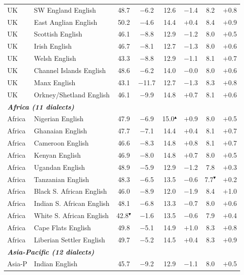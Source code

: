 \begin{table}[t]
\begin{tabular}{ll cc cc cc}
UK & SW England English & 48.7 & $-$6.2 & 12.6 & $-$1.4 & 8.2 & $+$0.8 \\
UK & East Anglian English & 50.2 & $-$4.6 & 14.4 & $+$0.4 & 8.4 & $+$0.9 \\
UK & Scottish English & 46.1 & $-$8.8 & 12.9 & $-$1.2 & 8.0 & $+$0.5 \\
UK & Irish English & 46.7 & $-$8.1 & 12.7 & $-$1.3 & 8.0 & $+$0.6 \\
UK & Welsh English & 43.3 & $-$8.8 & 12.9 & $-$1.1 & 8.1 & $+$0.7 \\
UK & Channel Islands English & 48.6 & $-$6.2 & 14.0 & $-$0.0 & 8.0 & $+$0.6 \\
UK & Manx English & 43.1 & $-$11.7 & 12.7 & $-$1.3 & 8.3 & $+$0.8 \\
UK & Orkney/Shetland English & 46.1 & $-$9.9 & 14.8 & $+$0.7 & 8.1 & $+$0.6 \\
\midrule
\multicolumn{8}{l}{\textit{\textbf{Africa (11 dialects)}}} \\
Africa & Nigerian English & 47.9 & $-$6.9 & 15.0$^\blacktriangle$ & $+$0.9 & 8.0 & $+$0.5 \\
Africa & Ghanaian English & 47.7 & $-$7.1 & 14.4 & $+$0.4 & 8.1 & $+$0.7 \\
Africa & Cameroon English & 46.6 & $-$8.3 & 14.8 & $+$0.8 & 8.1 & $+$0.7 \\
Africa & Kenyan English & 46.9 & $-$8.0 & 14.8 & $+$0.7 & 8.0 & $+$0.5 \\
Africa & Ugandan English & 48.9 & $-$5.9 & 12.9 & $-$1.2 & 7.8 & $+$0.3 \\
Africa & Tanzanian English & 48.3 & $-$6.5 & 13.5 & $-$0.6 & 7.7$^\blacktriangledown$ & $+$0.2 \\
Africa & Black S. African English & 46.0 & $-$8.9 & 12.0 & $-$1.9 & 8.4 & $+$1.0 \\
Africa & Indian S. African English & 48.1 & $-$6.8 & 13.3 & $-$0.7 & 8.0 & $+$0.6 \\
Africa & White S. African English & 42.8$^\blacktriangledown$ & $-$1.6 & 13.5 & $-$0.6 & 7.9 & $+$0.4 \\
Africa & Cape Flats English & 49.8 & $-$5.1 & 14.9 & $+$1.0 & 8.3 & $+$0.8 \\
Africa & Liberian Settler English & 49.7 & $-$5.2 & 14.5 & $+$0.4 & 8.3 & $+$0.9 \\
\midrule
\multicolumn{8}{l}{\textit{\textbf{Asia-Pacific (12 dialects)}}} \\
Asia-P & Indian English & 45.7 & $-$9.2 & 12.9 & $-$1.1 & 8.0 & $+$0.5 \\

\end{tabular}
\end{table}
